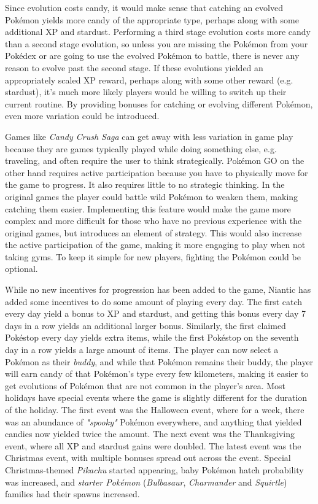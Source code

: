 Since evolution costs candy, it would make sense that catching an evolved Pokémon yields more candy of the appropriate type, perhaps along with some additional XP and stardust. Performing a third stage evolution costs more candy than a second stage evolution, so unless you are missing the Pokémon from your Pokédex or are going to use the evolved Pokémon to battle, there is never any reason to evolve past the second stage. If these evolutions yielded an appropriately scaled XP reward, perhaps along with some other reward (e.g. stardust), it's much more likely players would be willing to switch up their current routine. By providing bonuses for catching or evolving different Pokémon, even more variation could be introduced.

Games like \emph{Candy Crush Saga} can get away with less variation in game play because they are games typically played while doing something else, e.g. traveling, and often require the user to think strategically. Pokémon GO on the other hand requires active participation because you have to physically move for the game to progress. It also requires little to no strategic thinking. In the original games the player could battle wild Pokémon to weaken them, making catching them easier. Implementing this feature would make the game more complex and more difficult for those who have no previous experience with the original games, but introduces an element of strategy. This would also increase the active participation of the game, making it more engaging to play when not taking gyms. To keep it simple for new players, fighting the Pokémon could be optional.

While no new incentives for progression has been added to the game, Niantic has added some incentives to do some amount of playing every day. The first catch every day yield a bonus to XP and stardust, and getting this bonus every day 7 days in a row yields an additional larger bonus. Similarly, the first claimed Pokéstop every day yields extra items, while the first Pokéstop on the seventh day in a row yields a large amount of items. The player can now select a Pokémon as their \emph{buddy}, and while that Pokémon remains their buddy, the player will earn candy of that Pokémon's type every few kilometers, making it easier to get evolutions of Pokémon that are not common in the player's area. Most holidays have special events where the game is slightly different for the duration of the holiday. The first event was the Halloween event, where for a week, there was an abundance of \emph{"spooky"} Pokémon everywhere, and anything that yielded candies now yielded twice the amount. The next event was the Thanksgiving event, where all XP and stardust gains were doubled. The latest event was the Christmas event, with multiple bonuses spread out across the event. Special Christmas-themed \emph{Pikachu} started appearing, baby Pokémon hatch probability was increased, and \emph{starter Pokémon} (\emph{Bulbasaur}, \emph{Charmander} and \emph{Squirtle}) families had their spawns increased.

